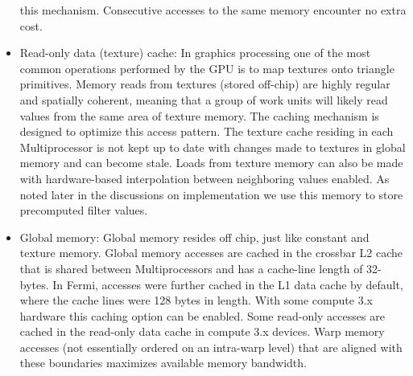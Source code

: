 \begin{itemize}
 this mechanism. Consecutive accesses to the same memory encounter no extra cost.
 \item Read-only data (texture) cache: In graphics processing one of the most common operations performed by the GPU is to map textures onto triangle primitives. 
 Memory reads from textures (stored off-chip) are highly regular and spatially coherent, meaning that a group of work units will likely read values from the same area of texture
 memory. The caching mechanism is designed to optimize this access pattern. The texture cache residing in each Multiprocessor is not kept up to date with changes made to
 textures in global memory and can become stale. Loads from texture memory can also be made with hardware-based interpolation between neighboring values enabled.
 As noted later in the discussions on implementation we use this memory to store precomputed filter values.
 \item Global memory: Global memory resides off chip, just like constant and texture memory. Global memory accesses are cached in the crossbar L2 cache that 
 is shared between Multiprocessors and has a cache-line length of 32-bytes. In Fermi, accesses were further cached in the L1
 data cache by default, where the cache lines were 128 bytes in length. With some compute 3.x hardware this caching option can be enabled. Some read-only 
 accesses are cached in the read-only data cache in compute 3.x devices. Warp memory accesses (not essentially ordered on an intra-warp level) that are aligned 
 with these boundaries maximizes available memory bandwidth.
\end{itemize}

